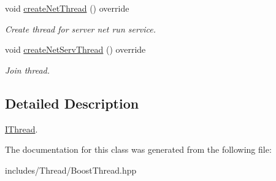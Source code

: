 \begin{DoxyCompactItemize}
\mbox{\label{classspider_1_1_boost_thread_abe1d8727c33ca633deb0807705258fef}} 
void \hyperlink{classspider_1_1_boost_thread_abe1d8727c33ca633deb0807705258fef}{create\+Net\+Thread} () override
\begin{DoxyCompactList}\small\item\em Create thread for server net run service. \end{DoxyCompactList}\item 
\mbox{\label{classspider_1_1_boost_thread_ae88b1c2c1e41fb15a103058de025b718}} 
void \hyperlink{classspider_1_1_boost_thread_ae88b1c2c1e41fb15a103058de025b718}{create\+Net\+Serv\+Thread} () override
\begin{DoxyCompactList}\small\item\em Join thread. \end{DoxyCompactList}\end{DoxyCompactItemize}


\subsection{Detailed Description}
\hyperlink{classspider_1_1_i_thread}{I\+Thread}. 

The documentation for this class was generated from the following file\+:\begin{DoxyCompactItemize}
\item 
includes/\+Thread/Boost\+Thread.\+hpp\end{DoxyCompactItemize}
